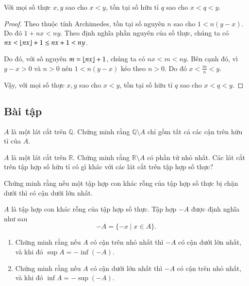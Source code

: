 \begin{theorem}
	Với mọi số thực $x, y$ sao cho $x < y$, tồn tại số hữu tỉ $q$ sao cho $x < q < y$.
\end{theorem}

\begin{proof}
	Theo thuộc tính Archimedes, tồn tại số nguyên $n$ sao cho $1 < n(y - x)$. Do đó $1 + nx < ny$. Theo định nghĩa phần nguyên của số thực, chúng ta có $nx < \left\lfloor{nx}\right\rfloor + 1 \leq nx + 1 < ny$.

	Do đó, với số nguyên $m = \left\lfloor{nx}\right\rfloor + 1$, chúng ta có $nx < m < ny$. Bên cạnh đó, vì $y - x > 0$ và $n > 0$ nên  $1 < n(y - x)$ kéo theo $n > 0$. Do đó $x < \frac{m}{n} < y$.

	Vậy, với mọi số thực $x, y$ sao cho $x < y$, tồn tại số hữu tỉ $q$ sao cho $x < q < y$.
\end{proof}

\subsection{Bài tập}

\begin{exercise}
	$A$ là một lát cắt trên $\mathbb{Q}$. Chứng minh rằng $\mathbb{Q}\setminus A$ chỉ gồm tất cả các cận trên hữu tỉ của $A$.
\end{exercise}

\begin{exercise}
	$A$ là một lát cắt trên $\mathbb{R}$. Chứng minh rằng $\mathbb{R}\setminus A$ có phần tử nhỏ nhất. Các lát cắt trên tập hợp số hữu tỉ có gì khác với các lát cắt trên tập hợp số thực?
\end{exercise}

\begin{exercise}
	Chứng minh rằng nếu một tập hợp con khác rỗng của tập hợp số thực bị chặn dưới thì có cận dưới lớn nhất.
\end{exercise}

\begin{exercise}
	$A$ là tập hợp con khác rỗng của tập hợp số thực. Tập hợp $-A$ được định nghĩa như sau
	\[
		-A = \{ -x \mid x\in A \}.
	\]
	\begin{enumerate}[label={(\roman*)}]
		\item Chứng minh rằng nếu $A$ có cận trên nhỏ nhất thì $-A$ có cận dưới lớn nhất, và khi đó $\sup A = -\inf (-A)$.
		\item Chứng minh rằng nếu $A$ có cận dưới lớn nhất thì $-A$ có cận trên nhỏ nhất, và khi đó $\inf A = -\sup (-A)$.
	\end{enumerate}
\end{exercise}

